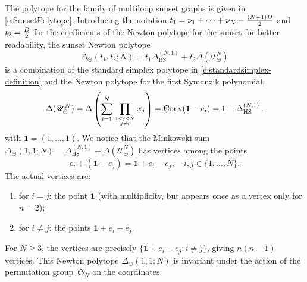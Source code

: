 \documentclass[12pt,a4paper]{article}
\theoremstyle{plain}
\theoremstyle{remark}
\newcommand{\nprops}{N}
\newcommand{\cU}{\mathscr {U}}
\newcommand{\Conv}{\operatorname{Conv}}
\newcommand{\Newton}{\Delta}
\newcommand{\simplexwithpars}[1]{\Newton_{\text{HS}}^{(#1)}}
\begin{document}
The polytope for the family of
multiloop sunset graphs is given in
\cref{e:SunsetPolytope}. Introducing   the notation $t_1=\nu_1+\cdots+\nu_{\nprops}-{(\nprops-1)D\over2}$ and
$t_2={D\over2}$ for the coefficients of the Newton polytope for the
sunset for better readability, the sunset Newton polytope
\begin{equation}
  \label{e:PolySun}
  \Delta_{\circleddash}(t_1,t_2;\nprops)=t_1 \simplexwithpars{\nprops,1} +t_2  \Newton(\cU_{\circleddash}^{\nprops})
\end{equation}
is a combination of the standard simplex polytope in 
\cref{e:standardsimplex-definition}
and the Newton polytope for the first Symanzik polynomial,
\begin{equation}
  \Newton(\cU_{\circleddash}^{\nprops})=\Newton\left(\sum_{i=1}^{\nprops} \prod_{1\leq 
    j\leq \nprops\atop j\neq i} x_j\right) =  \Conv(\mathbf 1-e_i) =\mathbf 1-\simplexwithpars{\nprops,1}\,,
\end{equation}
with $\mathbf 1=(1,\dots,1)$.
We notice that the Minkowski sum $\Delta_{\circleddash}(1,1;\nprops)=\simplexwithpars{\nprops,1}  + \Newton(\cU_{\circleddash}^{\nprops})$ has vertices among the points
\begin{equation}
e_i + (\mathbf{1} - e_j) = \mathbf{1} + e_i - e_j, \quad i, j \in \{1, \ldots, \nprops\}.
\end{equation}
The actual vertices are:
\begin{enumerate}[label=(\roman*)]
    \item for $i = j$: the point $\mathbf{1}$ (with multiplicity, but appears once as a vertex only for $n = 2$);
    \item for $i \neq j$: the points $\mathbf{1} + e_i - e_j$.
\end{enumerate}
For $\nprops \geq 3$, the vertices are precisely $\{\mathbf{1} + e_i - e_j : i \neq j\}$, giving $n(n-1)$ vertices.
This Newton polytope $\Delta_{\circleddash}(1,1;\nprops)$ is invariant under the action of the permutation group~$\mathfrak S_{\nprops}$ on the coordinates.
\end{document}
